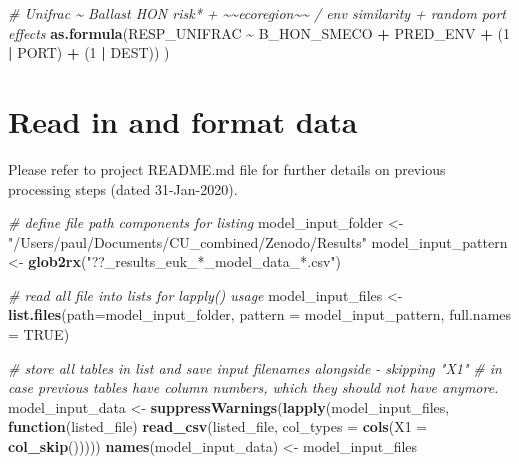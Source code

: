 \documentclass[
]{article}
\newenvironment{Shaded}{\begin{snugshade}}{\end{snugshade}}
\newcommand{\CommentTok}[1]{\textcolor[rgb]{0.56,0.35,0.01}{\textit{#1}}}
\newcommand{\ControlFlowTok}[1]{\textcolor[rgb]{0.13,0.29,0.53}{\textbf{#1}}}
\newcommand{\DataTypeTok}[1]{\textcolor[rgb]{0.13,0.29,0.53}{#1}}
\newcommand{\DecValTok}[1]{\textcolor[rgb]{0.00,0.00,0.81}{#1}}
\newcommand{\KeywordTok}[1]{\textcolor[rgb]{0.13,0.29,0.53}{\textbf{#1}}}
\newcommand{\NormalTok}[1]{#1}
\newcommand{\OperatorTok}[1]{\textcolor[rgb]{0.81,0.36,0.00}{\textbf{#1}}}
\newcommand{\OtherTok}[1]{\textcolor[rgb]{0.56,0.35,0.01}{#1}}
\newcommand{\StringTok}[1]{\textcolor[rgb]{0.31,0.60,0.02}{#1}}
\begin{document}
\begin{Shaded}
\begin{Highlighting}[]
  \CommentTok{\# Unifrac \textasciitilde{} Ballast HON risk* + \textasciitilde{}\textasciitilde{}ecoregion\textasciitilde{}\textasciitilde{} / env similarity + random port effects}
  \KeywordTok{as.formula}\NormalTok{(RESP\_UNIFRAC }\OperatorTok{\textasciitilde{}}\StringTok{ }\NormalTok{B\_HON\_SMECO }\OperatorTok{+}\StringTok{ }\NormalTok{PRED\_ENV }\OperatorTok{+}\StringTok{ }\NormalTok{(}\DecValTok{1} \OperatorTok{|}\StringTok{ }\NormalTok{PORT) }\OperatorTok{+}\StringTok{ }\NormalTok{(}\DecValTok{1} \OperatorTok{|}\StringTok{ }\NormalTok{DEST))}
\NormalTok{)}
\end{Highlighting}
\end{Shaded}

\hypertarget{read-in-and-format-data}{%
\section{Read in and format data}\label{read-in-and-format-data}}

Please refer to project README.md file for further details on previous
processing steps (dated 31-Jan-2020).

\begin{Shaded}
\begin{Highlighting}[]
\CommentTok{\# define file path components for listing }
\NormalTok{model\_input\_folder <{-}}\StringTok{ "/Users/paul/Documents/CU\_combined/Zenodo/Results"}
\NormalTok{model\_input\_pattern <{-}}\StringTok{ }\KeywordTok{glob2rx}\NormalTok{(}\StringTok{"??\_results\_euk\_*\_model\_data\_*.csv"}\NormalTok{)}

\CommentTok{\# read all file into lists for \textasciigrave{}lapply()\textasciigrave{} usage}
\NormalTok{model\_input\_files <{-}}\StringTok{ }\KeywordTok{list.files}\NormalTok{(}\DataTypeTok{path=}\NormalTok{model\_input\_folder, }
  \DataTypeTok{pattern =}\NormalTok{ model\_input\_pattern, }\DataTypeTok{full.names =} \OtherTok{TRUE}\NormalTok{)}

\CommentTok{\# store all tables in list and save input filenames alongside {-} skipping "X1" }
\CommentTok{\#  in case previous tables have column numbers, which they should not have anymore.}
\NormalTok{model\_input\_data <{-}}\StringTok{ }\KeywordTok{suppressWarnings}\NormalTok{(}\KeywordTok{lapply}\NormalTok{(model\_input\_files, }
  \ControlFlowTok{function}\NormalTok{(listed\_file)  }\KeywordTok{read\_csv}\NormalTok{(listed\_file, }\DataTypeTok{col\_types =} \KeywordTok{cols}\NormalTok{(}\StringTok{\textquotesingle{}X1\textquotesingle{}}\NormalTok{ =}\StringTok{ }\KeywordTok{col\_skip}\NormalTok{()))))}
\KeywordTok{names}\NormalTok{(model\_input\_data) <{-}}\StringTok{ }\NormalTok{model\_input\_files}
\end{Highlighting}
\end{Shaded}
\end{document}
